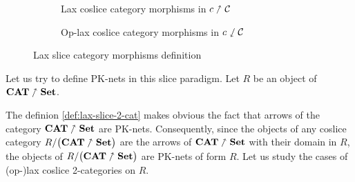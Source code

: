 \begin{figure*}[t!]
\begin{subfigure}[t]{0.47\textwidth}
        \caption{Lax coslice category morphisms in $c\nnearrow\mathcal{C}$}
        \label{fig:lax-coslice-def}
    \end{subfigure}%
    \hfill
    \begin{subfigure}[t]{0.47\textwidth}
        \centering
        \caption{Op-lax coslice category morphisms in
            $c \sswarrow \mathcal{C}$}
        \label{fig:oplax-coslice-def}
    \end{subfigure}
    \caption{Lax slice category morphisms definition}
    \label{fig:all-lax-slice-def}
\end{figure*}

Let us try to define PK-nets in this slice paradigm. Let $R$ be an object of $\textbf{CAT}\nnearrow\bf Set$.

The definion \ref{def:lax-slice-2-cat} makes obvious the fact that arrows of the category $\textbf{CAT}\nnearrow\bf Set$ are PK-nets. Consequently, since the objects of any coslice category $R/\big(\textbf{CAT}\nnearrow\bf Set\big)$ are the arrows of $\textbf{CAT}\nnearrow\bf Set$ with their domain in $R$, the objects of  $R/\big(\textbf{CAT}\nnearrow\bf Set\big)$ are PK-nets of form $R$. Let us study the cases of (op-)lax coslice 2-categories on $R$.

